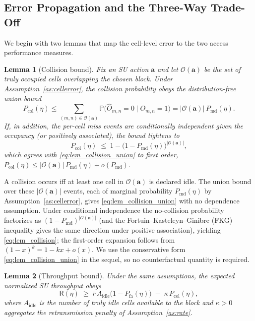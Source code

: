 \documentclass[journal]{IEEEtran}
\newtheorem{lemma}{Lemma}
\newcommand{\Prob}{\mathbb{P}}
\newcommand{\occ}{O}                       %
\newcommand{\Pmd}{P_{\mathrm{md}}}         %
\newcommand{\Pfa}{P_{\mathrm{fa}}}         %
\newcommand{\thr}{\eta}                    %
\newcommand{\act}{\bm{a}}                  %
\newcommand{\Pcol}{P_{\mathrm{col}}}       %
\newcommand{\thru}{\mathsf{R}}             %
\begin{document}
\subsection{Error Propagation and the Three-Way Trade-Off}
\label{subsec:thmA}

We begin with two lemmas that map the cell-level error to the two access
performance measures.

\begin{lemma}[Collision bound]
\label{lem:collision}
Fix an SU action $\act$ and let $\mathcal{O}(\act)$ be the set of truly
occupied cells overlapping the chosen block. Under
Assumption~\ref{as:cellerror}, the collision probability obeys the
distribution-free union bound
\begin{equation}
\Pcol(\thr)\le\!\!\sum_{(m,n)\in\mathcal{O}(\act)}\!\!
\Prob\big(\hat\occ_{m,n}{=}0\mid \occ_{m,n}{=}1\big)
=|\mathcal{O}(\act)|\,\Pmd(\thr).
\label{eq:lem_collision_union}
\end{equation}
If, in addition, the per-cell miss events are conditionally independent given
the occupancy (or positively associated), the bound tightens to
\begin{equation}
\Pcol(\thr)\;\le\;1-\bigl(1-\Pmd(\thr)\bigr)^{|\mathcal{O}(\act)|},
\label{eq:lem_collision}
\end{equation}
which agrees with \eqref{eq:lem_collision_union} to first order,
$\Pcol(\thr)\le|\mathcal{O}(\act)|\,\Pmd(\thr)+o(\Pmd)$.
\end{lemma}

\begin{IEEEproof}
A collision occurs iff at least one cell in $\mathcal{O}(\act)$ is declared
idle. The union bound over these $|\mathcal{O}(\act)|$ events, each of
marginal probability $\Pmd(\thr)$ by Assumption~\ref{as:cellerror}, gives
\eqref{eq:lem_collision_union} with no dependence assumption. Under
conditional independence the no-collision probability factorizes as
$(1-\Pmd)^{|\mathcal{O}(\act)|}$ (and the Fortuin--Kasteleyn--Ginibre (FKG)
inequality gives the same direction under positive association), yielding \eqref{eq:lem_collision};
the first-order expansion follows from $(1-x)^{k}=1-kx+o(x)$. We use the
conservative form \eqref{eq:lem_collision_union} in the sequel, so no
counterfactual quantity is required.
\end{IEEEproof}

\begin{lemma}[Throughput bound]
\label{lem:throughput}
Under the same assumptions, the expected normalized SU throughput obeys
\begin{equation}
\thru(\thr) \;\ge\; \bar{r}\,A_{\mathrm{idle}}\bigl(1-\Pfa(\thr)\bigr)
\;-\; \kappa\,\Pcol(\thr),
\label{eq:lem_throughput}
\end{equation}
where $A_{\mathrm{idle}}$ is the number of truly idle cells available to the
block and $\kappa>0$ aggregates the retransmission penalty of
Assumption~\ref{as:rate}.
\end{lemma}
\end{document}
